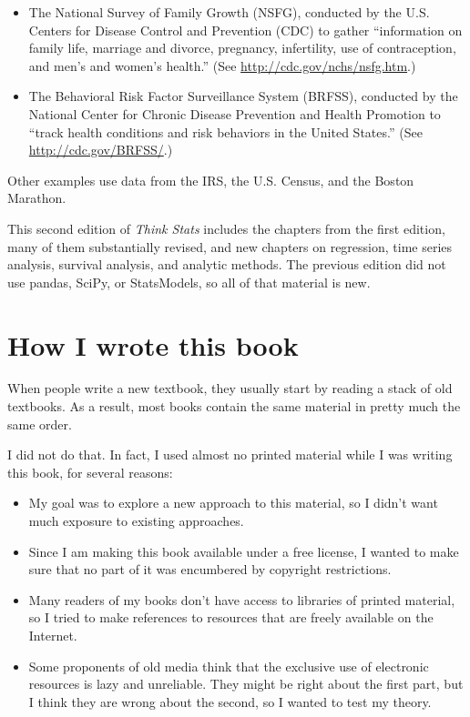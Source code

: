 \documentclass[12pt]{book}
\begin{document}
\begin{itemize}

\item The National Survey of Family Growth (NSFG), conducted by the
  U.S. Centers for Disease Control and Prevention (CDC) to gather
  ``information on family life, marriage and divorce, pregnancy,
  infertility, use of contraception, and men's and women's health.''
  (See \url{http://cdc.gov/nchs/nsfg.htm}.)

\item The Behavioral Risk Factor Surveillance System (BRFSS),
  conducted by the National Center for Chronic Disease Prevention and
  Health Promotion to ``track health conditions and risk behaviors in
  the United States.''  (See \url{http://cdc.gov/BRFSS/}.)

\end{itemize}

Other examples use data from the IRS, the U.S. Census, and
the Boston Marathon.

This second edition of {\it Think Stats} includes the chapters from
the first edition, many of them substantially revised, and new
chapters on regression, time series analysis, survival analysis,
and analytic methods.  The previous edition did not use pandas,
SciPy, or StatsModels, so all of that material is new.


\section{How I wrote this book}

When people write a new textbook, they usually start by
reading a stack of old textbooks.  As a result, most books
contain the same material in pretty much the same order.

I did not do that.  In fact, I used almost no printed material while I
was writing this book, for several reasons:

\begin{itemize}

\item My goal was to explore a new approach to this material, so I didn't
want much exposure to existing approaches.

\item Since I am making this book available under a free license, I wanted
to make sure that no part of it was encumbered by copyright restrictions.

\item Many readers of my books don't have access to libraries of
printed material, so I tried to make references to resources that are
freely available on the Internet.

\item Some proponents of old media think that the exclusive
use of electronic resources is lazy and unreliable.  They might be right
about the first part, but I think they are wrong about the second, so
I wanted to test my theory.


\end{itemize}
\end{document}
